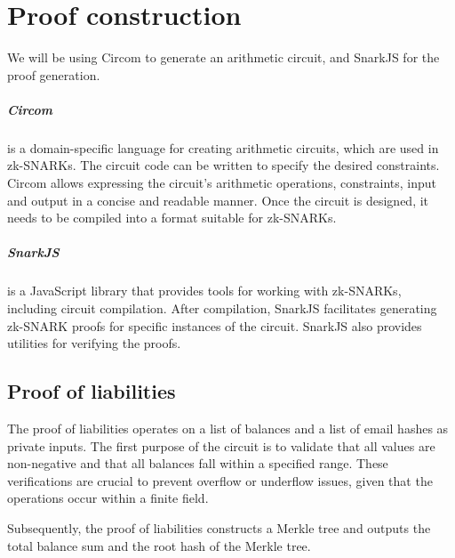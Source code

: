 
\chapter{Proof construction}
We will be using Circom to generate an arithmetic circuit, and SnarkJS for the proof generation.

\paragraph{Circom} is a domain-specific language for creating arithmetic circuits, which are used in zk-SNARKs.
The circuit code can be written to specify the desired constraints.
Circom allows expressing the circuit's arithmetic operations, constraints, input and output in a concise and readable manner.
Once the circuit is designed, it needs to be compiled into a format suitable for zk-SNARKs.


\paragraph{SnarkJS} is a JavaScript library that provides tools for working with zk-SNARKs, including circuit compilation.
After compilation, SnarkJS facilitates generating zk-SNARK proofs for specific instances of the circuit.
SnarkJS also provides utilities for verifying the proofs.


\section{Proof of liabilities}
\label{subsec:pl}
The proof of liabilities operates on a list of balances and a list of email hashes as private inputs.
The first purpose of the circuit is to validate that all values are non-negative and that all balances fall within a specified range.
These verifications are crucial to prevent overflow or underflow issues, given that the operations occur within a finite field.

Subsequently, the proof of liabilities constructs a Merkle tree and outputs the total balance sum and the root hash of the Merkle tree.

